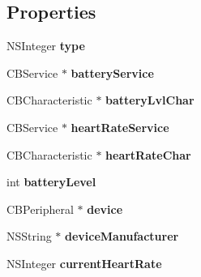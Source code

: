\subsection*{Properties}
\begin{DoxyCompactItemize}
\item 
\hypertarget{interface_polar_h7_a3819e12cc9802bca0611683cdeaf5775}{N\-S\-Integer {\bfseries type}}\label{interface_polar_h7_a3819e12cc9802bca0611683cdeaf5775}

\item 
\hypertarget{interface_polar_h7_a53721638b179d9373c6a3e17f6ffb3c9}{C\-B\-Service $\ast$ {\bfseries battery\-Service}}\label{interface_polar_h7_a53721638b179d9373c6a3e17f6ffb3c9}

\item 
\hypertarget{interface_polar_h7_a477f7039b2dd7cdcd96519b19cb72581}{C\-B\-Characteristic $\ast$ {\bfseries battery\-Lvl\-Char}}\label{interface_polar_h7_a477f7039b2dd7cdcd96519b19cb72581}

\item 
\hypertarget{interface_polar_h7_a18e69a928d7c29c7db4c6ca05b840064}{C\-B\-Service $\ast$ {\bfseries heart\-Rate\-Service}}\label{interface_polar_h7_a18e69a928d7c29c7db4c6ca05b840064}

\item 
\hypertarget{interface_polar_h7_a64ceb31db248ce9151f0ee1d97d97e6c}{C\-B\-Characteristic $\ast$ {\bfseries heart\-Rate\-Char}}\label{interface_polar_h7_a64ceb31db248ce9151f0ee1d97d97e6c}

\item 
\hypertarget{interface_polar_h7_a333bcccf6282727ccd5e159a66fb6376}{int {\bfseries battery\-Level}}\label{interface_polar_h7_a333bcccf6282727ccd5e159a66fb6376}

\item 
\hypertarget{interface_polar_h7_a8ac64bcce44c2cff369e6edf4e58329d}{C\-B\-Peripheral $\ast$ {\bfseries device}}\label{interface_polar_h7_a8ac64bcce44c2cff369e6edf4e58329d}

\item 
\hypertarget{interface_polar_h7_ad654b125b8f042a6c2407ad4840ac401}{N\-S\-String $\ast$ {\bfseries device\-Manufacturer}}\label{interface_polar_h7_ad654b125b8f042a6c2407ad4840ac401}

\item 
\hypertarget{interface_polar_h7_a1d4ad05750f8373bdf15aad8f9e2cb6d}{N\-S\-Integer {\bfseries current\-Heart\-Rate}}\label{interface_polar_h7_a1d4ad05750f8373bdf15aad8f9e2cb6d}

\end{DoxyCompactItemize}
